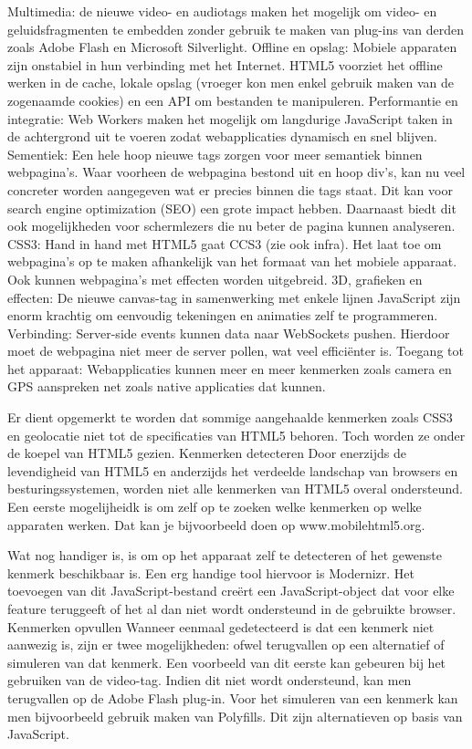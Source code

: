 Multimedia:  de nieuwe video- en audiotags maken het mogelijk om video- en geluidsfragmenten te embedden zonder gebruik te maken van plug-ins van derden zoals Adobe Flash en Microsoft Silverlight.
Offline en opslag:  Mobiele apparaten zijn onstabiel in hun verbinding met het Internet. HTML5 voorziet het offline werken in de cache, lokale opslag (vroeger kon men enkel gebruik maken van de zogenaamde cookies) en een API om bestanden te manipuleren.
Performantie en integratie:  Web Workers maken het mogelijk om langdurige JavaScript taken in de achtergrond uit te voeren zodat webapplicaties dynamisch en snel blijven.
Sementiek:  Een hele hoop nieuwe tags zorgen voor meer semantiek binnen webpagina's. Waar voorheen de webpagina bestond uit en hoop div's, kan nu veel concreter worden aangegeven wat er precies binnen die tags staat. Dit kan voor search engine optimization (SEO) een grote impact hebben. Daarnaast biedt dit ook mogelijkheden voor schermlezers die nu beter de pagina kunnen analyseren.
CSS3:  Hand in hand met HTML5 gaat CCS3 (zie ook infra). Het laat toe om webpagina's op te maken afhankelijk van het formaat van het mobiele apparaat. Ook kunnen webpagina's met effecten worden uitgebreid. 
3D,  grafieken en effecten:  De nieuwe canvas-tag in samenwerking met enkele lijnen JavaScript zijn enorm krachtig om eenvoudig tekeningen en animaties zelf te programmeren.
Verbinding:  Server-side events kunnen data naar WebSockets pushen. Hierdoor moet de webpagina niet meer de server pollen, wat veel efficiënter is.
Toegang tot het apparaat: Webapplicaties kunnen meer en meer kenmerken zoals camera en GPS aanspreken net zoals native applicaties dat kunnen. 

Er dient opgemerkt te worden dat sommige aangehaalde kenmerken zoals CSS3 en geolocatie niet tot de specificaties van HTML5 behoren. Toch worden ze onder de koepel van HTML5 gezien.
Kenmerken detecteren
Door enerzijds de levendigheid van HTML5 en anderzijds het verdeelde landschap van browsers en besturingssystemen, worden niet alle kenmerken van HTML5 overal ondersteund. Een eerste mogelijheidk is om zelf op te zoeken welke kenmerken op welke apparaten werken. Dat kan je bijvoorbeeld doen op www.mobilehtml5.org. 

Wat nog handiger is, is om op het apparaat zelf te detecteren of het gewenste kenmerk beschikbaar is. Een erg handige tool hiervoor is Modernizr.  Het toevoegen van dit JavaScript-bestand creërt een JavaScript-object dat voor elke feature teruggeeft of het al dan niet wordt ondersteund in de gebruikte browser.
Kenmerken opvullen
Wanneer eenmaal gedetecteerd is dat een kenmerk niet aanwezig is, zijn er twee mogelijkheden: ofwel terugvallen op een alternatief of simuleren van dat kenmerk. Een voorbeeld van dit eerste kan gebeuren bij het gebruiken van de video-tag. Indien dit niet wordt ondersteund, kan men terugvallen op de Adobe Flash plug-in. Voor het simuleren van een kenmerk kan men bijvoorbeeld gebruik maken van Polyfills. Dit zijn alternatieven op basis van JavaScript.

